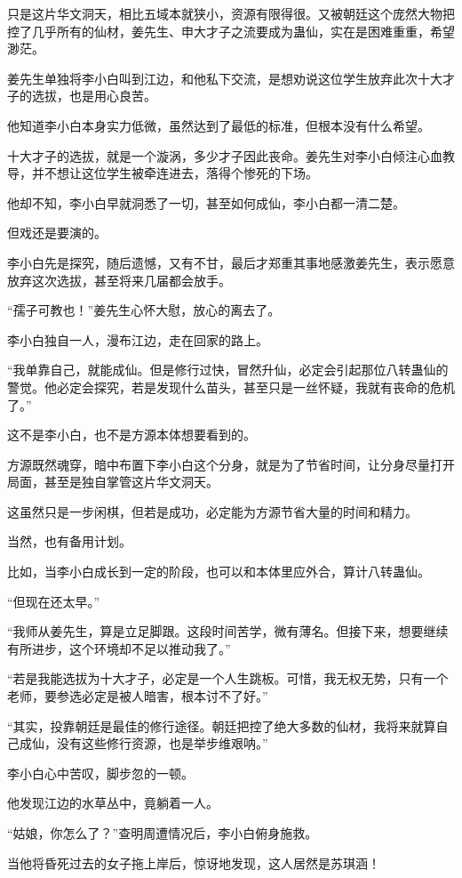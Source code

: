 \begin{this_body}
只是这片华文洞天，相比五域本就狭小，资源有限得很。又被朝廷这个庞然大物把控了几乎所有的仙材，姜先生、申大才子之流要成为蛊仙，实在是困难重重，希望渺茫。

姜先生单独将李小白叫到江边，和他私下交流，是想劝说这位学生放弃此次十大才子的选拔，也是用心良苦。

他知道李小白本身实力低微，虽然达到了最低的标准，但根本没有什么希望。

十大才子的选拔，就是一个漩涡，多少才子因此丧命。姜先生对李小白倾注心血教导，并不想让这位学生被牵连进去，落得个惨死的下场。

他却不知，李小白早就洞悉了一切，甚至如何成仙，李小白都一清二楚。

但戏还是要演的。

李小白先是探究，随后遗憾，又有不甘，最后才郑重其事地感激姜先生，表示愿意放弃这次选拔，甚至将来几届都会放手。

“孺子可教也！”姜先生心怀大慰，放心的离去了。

李小白独自一人，漫布江边，走在回家的路上。

“我单靠自己，就能成仙。但是修行过快，冒然升仙，必定会引起那位八转蛊仙的警觉。他必定会探究，若是发现什么苗头，甚至只是一丝怀疑，我就有丧命的危机了。”

这不是李小白，也不是方源本体想要看到的。

方源既然魂穿，暗中布置下李小白这个分身，就是为了节省时间，让分身尽量打开局面，甚至是独自掌管这片华文洞天。

这虽然只是一步闲棋，但若是成功，必定能为方源节省大量的时间和精力。

当然，也有备用计划。

比如，当李小白成长到一定的阶段，也可以和本体里应外合，算计八转蛊仙。

“但现在还太早。”

“我师从姜先生，算是立足脚跟。这段时间苦学，微有薄名。但接下来，想要继续有所进步，这个环境却不足以推动我了。”

“若是我能选拔为十大才子，必定是一个人生跳板。可惜，我无权无势，只有一个老师，要参选必定是被人暗害，根本讨不了好。”

“其实，投靠朝廷是最佳的修行途径。朝廷把控了绝大多数的仙材，我将来就算自己成仙，没有这些修行资源，也是举步维艰呐。”

李小白心中苦叹，脚步忽的一顿。

他发现江边的水草丛中，竟躺着一人。

“姑娘，你怎么了？”查明周遭情况后，李小白俯身施救。

当他将昏死过去的女子拖上岸后，惊讶地发现，这人居然是苏琪涵！


\end{this_body}
